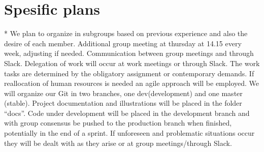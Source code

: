 \documentclass{article}
\begin{document}
\section*{Spesific plans}
* We plan to organize in subgroups based on previous experience and also the desire of each member.
\newline * Additional group meeting at thursday at 14.15 every week, adjusting if needed.
\newline * Communication between group meetings and through Slack.
\newline * Delegation of work will occur at work meetings or through Slack. The work tasks are determined by the obligatory assignment or contemporary demands. If reallocation of human resources is needed an agile approach will be employed. 
\newline * We will organize our Git in two branches, one dev(development) and one master (stable).
\newline * Project documentation and illustrations will be placed in the folder “docs”. 
\newline * Code under development will be placed in the development branch and with group consensus be pushed to the production branch when finished, potentially in the end of a sprint.
\newline * If unforeseen and problematic situations occur they will be dealt with as they arise or at group meetings/through Slack.
\end{document}
